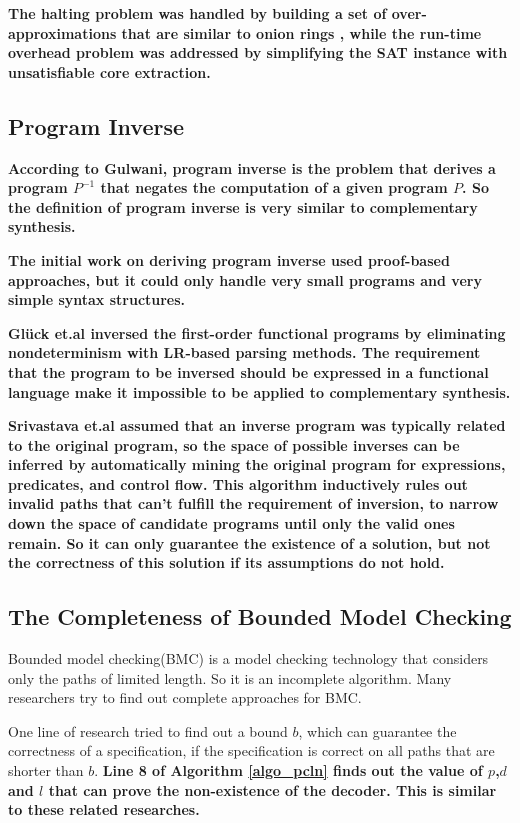 \documentclass[journal]{IEEEtran}
\begin{document}
\textbf{The halting problem was handled by building a set of over-approximations that are similar to onion rings \cite{ShengYuShen:fmcad10},
while the run-time overhead problem was addressed by simplifying the SAT instance with unsatisfiable core extraction\cite{ShengYuShen:tcad}.}

\subsection{Program Inverse}\label{subsec_proinv}
\textbf{According to Gulwani\cite{dim_syn},
program inverse is the problem that derives a program $P^{-1}$
that negates the computation of a given program $P$.
So the definition of program inverse is very similar to complementary synthesis.}

\textbf{The initial work on deriving program inverse used proof-based approaches\cite{prog_inv},
but it could only handle very small programs and very simple syntax structures.}

\textbf{Gl\"{u}ck et.al \cite{mtd_autoProginv} inversed the first-order functional programs
by eliminating nondeterminism with LR-based parsing methods.
The requirement that the program to be inversed should be expressed in a functional language make it impossible to be applied to complementary synthesis.}

\textbf{Srivastava et.al \cite{prog_inv_rev} assumed that an inverse program was typically related to the original program,
so the space of possible inverses can be inferred by automatically
mining the original program for expressions, predicates, and control flow.
This algorithm inductively rules out invalid paths that can't fulfill the requirement of inversion,
to narrow down the space of candidate programs until only the valid ones remain.
So it can only guarantee the existence of a solution,
but not the correctness of this solution if its assumptions do not hold.}



\subsection{The Completeness of Bounded Model Checking}\label{subsec_bmc_relate}
Bounded model checking(BMC) \cite{bmc_tacas99} is a model checking technology that considers only the paths of limited length.
So it is an incomplete algorithm.
Many researchers try to find out complete approaches for BMC.

One line of research\cite{bmc_tacas99,RecDiam} tried to find out a bound $b$,
which can guarantee the correctness of a specification,
if the specification is correct on all paths that are shorter than $b$.
\textbf{Line 8 of Algorithm \ref{algo_pcln} finds out the value of $p$,$d$ and $l$ that can prove the non-existence of the decoder.
This is similar to these related researches.}
\end{document}
